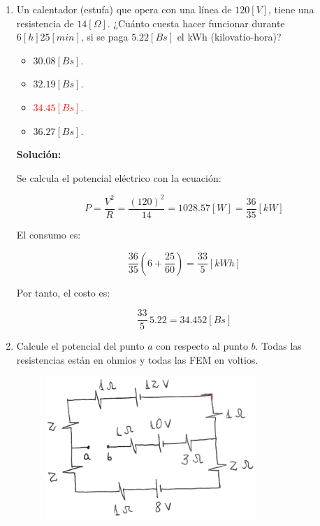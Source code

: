 \documentclass[letter,11pt]{article}
\begin{document}
\begin{enumerate}
\item Un calentador (estufa) que opera con una línea de $120 [V]$, tiene una
resistencia de $14 [\Omega]$. ¿Cuánto cuesta hacer funcionar durante
$6 [h] 25 [min]$, si se paga $5.22 [Bs]$ el kWh (kilovatio-hora)?

\begin{itemize}
    \item $30.08 [Bs]$.
    \item $32.19 [Bs]$.
    \item \textcolor{red}{$34.45 [Bs]$.}
    \item $36.27 [Bs]$.
\end{itemize}

\textbf{Solución:}

Se calcula el potencial eléctrico con la ecuación:

\begin{equation*}
    P = \frac{V^2}{R} = \frac{(120)^2}{14} = 1028.57 [W] = \frac{36}{35} [kW]
\end{equation*}

El consumo es:

\begin{equation*}
    \frac{36}{35} \left(6+\frac{25}{60}\right) = \frac{33}{5} [kWh]
\end{equation*}

Por tanto, el costo es:

\begin{equation*}
    \frac{33}{5}\,5.22 = 34.452 [Bs]
\end{equation*}

\item Calcule el potencial del punto $a$ con respecto al punto $b$. Todas las
resistencias están en ohmios y todas las FEM en voltios.

\begin{figure}[!h]
\centering
\includegraphics[scale=1.80]{resources/q7.eps}
\end{figure}


\end{enumerate}
\end{document}
